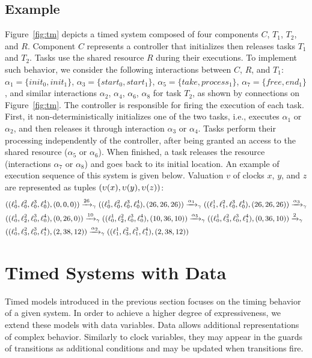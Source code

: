 \subsection{Example}\label{exp:run}

Figure~\ref{fig:tm} depicts a timed system composed of four components $C$, $T_1$, $T_2$, 
and $R$.
Component $C$ represents a  controller that initializes then releases tasks $T_1$ and $T_2$.
Tasks use the shared resource $R$ during their executions.
To implement such behavior, we consider the following interactions between $C$, $R$, and 
$T_1$: $\alpha_1=\{init_0, init_1\}$,
$\alpha_3=\{start_0, start_1\}$, $\alpha_5=\{ take, process_1\}$, $\alpha_7 = 
\{free, end_1 \}$, 
and similar interactions $\alpha_2$, $\alpha_4$, $\alpha_6$, $\alpha_8$ for task $T_2$, 
as shown by connections on Figure~\ref{fig:tm}.
The controller is responsible for firing
the execution of each task. First, it non-deterministically initializes one
of the two tasks, i.e., executes $\alpha_1$ or $\alpha_2$, and then
releases it through interaction $\alpha_3$ or $\alpha_4$.
Tasks perform their processing independently of the controller, after being granted an access 
to the shared resource ($\alpha_5$ or $\alpha_6$).
When finished, a task releases the resource (interactions $\alpha_7$ or $\alpha_8$) and goes 
back to its initial location.
An example of execution sequence of this system is given below. Valuation $v$ of clocks $x$, 
$y$, and $z$ are represented as tuples 
$(\upsilon(x),\upsilon(y),\upsilon(z))$:
\begin{displaymath}
\small{
\begin{split}
&((\ell_0^1,\ell_0^2,\ell_0^3,\ell_0^4),(0,0,0))\xrightarrow{26}_{\gamma}
((\ell_0^1,\ell_0^2,\ell_0^3,\ell_0^4),(26,26,26))\xrightarrow{\alpha_1}_{\gamma}
((\ell_1^1,\ell_1^2,\ell_0^3,\ell_0^4),(26,26,26))\xrightarrow{\alpha_3}_{\gamma}\\
&((\ell_0^1,\ell_2^2,\ell_0^3,\ell_0^4),(0,26,0))\xrightarrow{10}_{\gamma}
((\ell_0^1,\ell_2^2,\ell_0^3,\ell_0^4),(10,36,10))\xrightarrow{\alpha_5}_{\gamma}
((\ell_0^1,\ell_3^2,\ell_0^3,\ell_1^4),(0,36,10))\xrightarrow{2}_{\gamma}\\&
((\ell_0^1,\ell_3^2,\ell_0^3,\ell_1^4),(2,38,12))\xrightarrow{\alpha_2}_{\gamma}
((\ell_1^1,\ell_3^2,\ell_1^3,\ell_1^4),(2,38,12))
\end{split}
}
\end{displaymath}

\section{Timed Systems with Data}
Timed models introduced in the previous section focuses on the timing behavior of a given system.
In order to achieve a higher degree of expressiveness, we extend these models with data variables.
Data allows additional representations of complex behavior. Similarly to clock variables, they may
appear in the guards of transitions as additional conditions and may be updated when transitions
fire.

